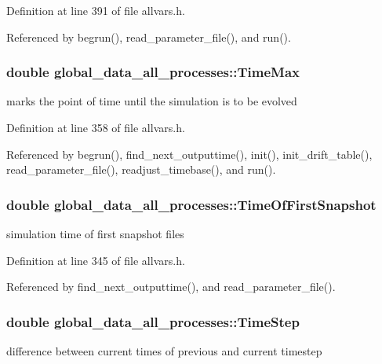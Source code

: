 Definition at line 391 of file allvars.h.



Referenced by begrun(), read\_\-parameter\_\-file(), and run().

\hypertarget{structglobal__data__all__processes_a3e22fbc2ce177c1e383e9acbbf44f8d5}{
\subsubsection[{TimeMax}]{\setlength{\rightskip}{0pt plus 5cm}double {\bf global\_\-data\_\-all\_\-processes::TimeMax}}}
\label{structglobal__data__all__processes_a3e22fbc2ce177c1e383e9acbbf44f8d5}
marks the point of time until the simulation is to be evolved 

Definition at line 358 of file allvars.h.



Referenced by begrun(), find\_\-next\_\-outputtime(), init(), init\_\-drift\_\-table(), read\_\-parameter\_\-file(), readjust\_\-timebase(), and run().

\hypertarget{structglobal__data__all__processes_a18e4063fbc1f92e8c59d6e59c7b20631}{
\subsubsection[{TimeOfFirstSnapshot}]{\setlength{\rightskip}{0pt plus 5cm}double {\bf global\_\-data\_\-all\_\-processes::TimeOfFirstSnapshot}}}
\label{structglobal__data__all__processes_a18e4063fbc1f92e8c59d6e59c7b20631}
simulation time of first snapshot files 

Definition at line 345 of file allvars.h.



Referenced by find\_\-next\_\-outputtime(), and read\_\-parameter\_\-file().

\hypertarget{structglobal__data__all__processes_a05a40a90ec77ac379054f82acbec87dc}{
\subsubsection[{TimeStep}]{\setlength{\rightskip}{0pt plus 5cm}double {\bf global\_\-data\_\-all\_\-processes::TimeStep}}}
\label{structglobal__data__all__processes_a05a40a90ec77ac379054f82acbec87dc}
difference between current times of previous and current timestep 

